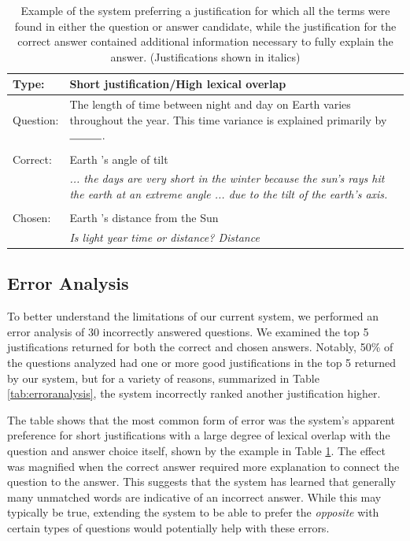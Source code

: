 \begin{table}[t]
\begin{center}
\begin{tabular}{p{2cm}p{12cm}}
\hline
Type: & \textbf{Short justification/High lexical overlap}\\
\hline
Question: & The length of time between night and day on Earth varies throughout the year. This time variance is explained primarily by $\rule{1cm}{0.15mm}$. \\
\\
Correct: & Earth 's angle of tilt \\
			 & \textit{ ... the days are very short in the winter because the sun's rays hit the earth at an extreme angle ... due to the tilt of the earth's axis. } \\
\\
Chosen: &  Earth 's distance from the Sun \\
			& \textit{ Is light year time or distance? Distance}	\\
\end{tabular}
\caption{{ Example of the system preferring a justification for which all the terms were found in either the question or answer candidate, while the justification for the correct answer contained additional information necessary to fully explain the answer. 
(Justifications shown in italics)
}} 
\label{tab:ex_lex_overlap}
\end{center}
\end{table}

\subsection{Error Analysis}
\label{sec-emnlp2017:erroranalysis}

To better understand the limitations of our current system, we performed an error analysis of 30 incorrectly answered questions.  
We examined the top 5 justifications returned for both the correct and chosen answers.  
Notably, 50\% of the questions analyzed had one or more good justifications in the top 5 returned by our system, but for a variety of reasons, summarized in Table \ref{tab:erroranalysis}, the system incorrectly ranked another justification higher.  

The table shows that the most common form of error was the system's apparent preference for short justifications with a large degree of lexical overlap with the question and answer choice itself, shown by the example in Table \ref{tab:ex_lex_overlap}.  The effect was magnified when the correct answer required more explanation to connect the question to the answer.  
This suggests that the system has learned that generally many unmatched words are indicative of an incorrect answer.  While this may typically be true, extending the system to be able to prefer the \emph{opposite} with certain types of questions would potentially help with these errors.  


